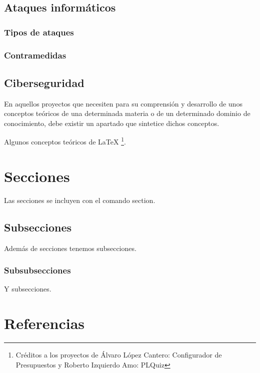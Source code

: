 \subsection{Ataques informáticos}

\subsubsection{Tipos de ataques}

\subsubsection{Contramedidas}

\subsection{Ciberseguridad}












En aquellos proyectos que necesiten para su comprensión y desarrollo de unos conceptos teóricos de una determinada materia o de un determinado dominio de conocimiento, debe existir un apartado que sintetice dichos conceptos.

Algunos conceptos teóricos de \LaTeX{} \footnote{Créditos a los proyectos de Álvaro López Cantero: Configurador de Presupuestos y Roberto Izquierdo Amo: PLQuiz}.
\section{Secciones}

Las secciones se incluyen con el comando section.

\subsection{Subsecciones}

Además de secciones tenemos subsecciones.

\subsubsection{Subsubsecciones}

Y subsecciones. 


\section{Referencias}

